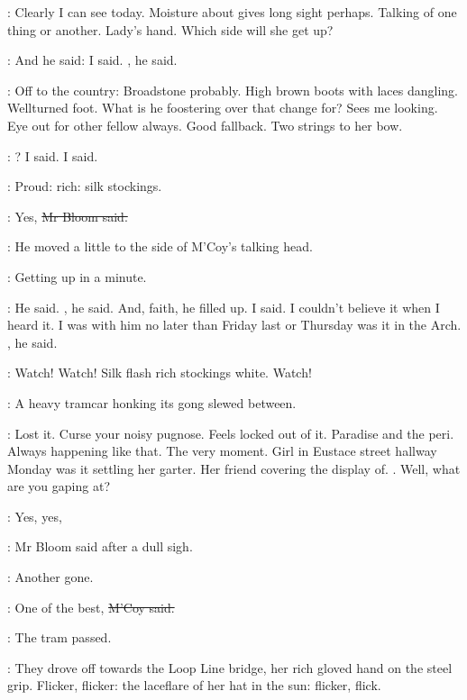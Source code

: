 \BloomInt:
Clearly I can see today.
Moisture about gives long sight perhaps.
Talking of one thing or another.
Lady's hand.
Which side will she get up?

\mccoy:
And he said: 
 I said.
, he said.

\BloomInt:
Off to the country:
Broadstone probably.
High brown boots with laces dangling.
Wellturned foot.
What is he foostering over that change for?
Sees me looking.
Eye out for other fellow always.
Good fallback.
Two strings to her bow.

\mccoy:
? I said.
 I said.

\BloomInt:
Proud:
rich:
silk stockings.

\Bloom:
Yes,
\sout{Mr Bloom said.}

:
He moved a little to the side of M'Coy's talking head.

\BloomInt:
Getting up in a minute.

\mccoy:
 He said.
, he said.
And, faith, he filled up.
 I said.
I couldn't believe it when I heard it.
I was with him no later than Friday last
or Thursday was it
in the Arch.
, he said.

\BloomInt:
Watch!
Watch!
Silk flash rich stockings white.
Watch!

:
A heavy tramcar honking its gong
slewed between.

\BloomInt:
Lost it.
Curse your noisy pugnose.
Feels locked out of it.
Paradise and the peri.
Always happening like that.
The very moment.
Girl in Eustace street hallway
Monday was it
settling her garter.
Her friend covering the display of.
.
Well, what are you gaping at?

\Bloom:
Yes, yes,

:
Mr Bloom said after a dull sigh.

\Bloom:
Another gone.

\mccoy:
One of the best,
\sout{M'Coy said.}

:
The tram passed.

:
They drove off towards the Loop Line bridge,
her rich gloved hand on the steel grip.
Flicker, flicker:
the laceflare of her hat in the sun:
flicker, flick.

